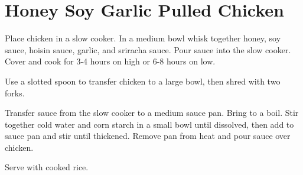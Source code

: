 \section{Honey Soy Garlic Pulled Chicken}
\begin{recipe}
	



Place chicken in a slow cooker. In a medium bowl whisk together honey, soy sauce, hoisin sauce, garlic, and sriracha sauce. Pour sauce into the slow cooker. Cover and cook for 3-4 hours on high or 6-8 hours on low.


Use a slotted spoon to transfer chicken to a large bowl, then shred with two forks.

Transfer sauce from the slow cooker to a medium sauce pan. Bring to a boil. Stir together cold water and corn starch in a small bowl until dissolved, then add to sauce pan and stir until thickened. Remove pan from heat and pour sauce over chicken.

Serve with cooked rice.
	
\end{recipe}
